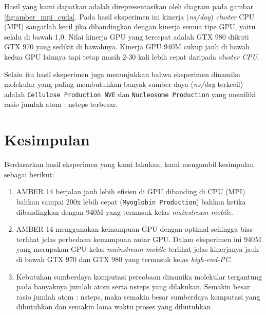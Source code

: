 Hasil yang kami dapatkan adalah direpresentasikan oleh diagram pada gambar \ref{fig:amber_mpi_cuda}. Pada hasil eksperimen ini kinerja (\textit{ns/day}) \textit{cluster} CPU (MPI) sangatlah kecil jika dibandingkan dengan kinerja semua tipe GPU, yaitu selalu di bawah 1,0. Nilai kinerja GPU yang tercepat adalah GTX 980 diikuti GTX 970 yang sedikit di bawahnya. Kinerja GPU 940M cukup jauh di bawah kedua GPU lainnya tapi tetap masih 2-30 kali lebih cepat daripada \textit{cluster CPU}.

Selain itu hasil eksperimen juga menunjukkan bahwa eksperimen dinamika molekular yang paling membutuhkan banyak sumber daya (\textit{ns/day} terkecil) adalah \verb|Cellulose Production NVE| dan \verb|Nucleosome Production| yang memiliki rasio jumlah atom : nsteps terbesar.

\section{Kesimpulan}

Berdasarkan hasil eksperimen yang kami lakukan, kami mengambil kesimpulan sebagai berikut:

\begin{enumerate}
	\item AMBER 14 berjalan jauh lebih efisien di GPU dibanding di CPU (MPI) bahkan sampai 200x lebih cepat (\verb|Myoglobin Production|) bahkan ketika dibandingkan dengan 940M yang termasuk kelas \textit{mainstream-mobile}.
	\item AMBER 14 menggunakan kemampuan GPU dengan optimal sehingga bias terlihat jelas perbedaan kemampuan antar GPU. Dalam eksperimen ini 940M yang merupakan GPU kelas \textit{mainstream-mobile} terlihat jelas kinerjanya jauh di bawah GTX 970 dan GTX 980 yang termasuk kelas \textit{high-end-PC}.
	\item Kebutuhan sumberdaya komputasi percobaan dinamika molekular tergantung pada banyaknya jumlah atom serta nsteps yang dilakukan. Semakin besar rasio jumlah atom : nsteps, maka semakin besar sumberdaya komputasi yang dibutuhkan dan semakin lama waktu proses yang dibutuhkan.
\end{enumerate}
